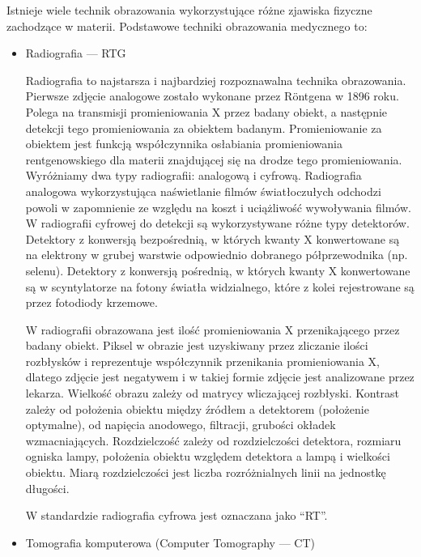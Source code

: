 Istnieje wiele technik obrazowania wykorzystujące różne zjawiska fizyczne zachodzące w materii.
Podstawowe techniki obrazowania medycznego to:
\label{sec:basic-imaging-technics}
\begin{itemize}
    \item Radiografia --- RTG

          Radiografia to najstarsza i najbardziej rozpoznawalna technika obrazowania.
          Pierwsze zdjęcie analogowe zostało wykonane przez Röntgena w 1896 roku.
          Polega na transmisji promieniowania X przez badany obiekt, a następnie detekcji tego promieniowania za obiektem badanym.
          Promieniowanie za obiektem jest funkcją współczynnika osłabiania promieniowania rentgenowskiego dla materii znajdującej się na drodze tego promieniowania.
          Wyróżniamy dwa typy radiografii: analogową i cyfrową.
          Radiografia analogowa wykorzystująca naświetlanie filmów światłoczułych odchodzi powoli w zapomnienie ze względu na koszt i uciążliwość wywoływania filmów.
          W radiografii cyfrowej do detekcji są wykorzystywane różne typy detektorów.
          Detektory z konwersją bezpośrednią, w których kwanty X konwertowane są na elektrony w grubej warstwie odpowiednio dobranego półprzewodnika (np. selenu).
          Detektory z konwersją pośrednią, w których kwanty X konwertowane są w scyntylatorze na fotony światła widzialnego, które z kolei rejestrowane są przez fotodiody krzemowe.

          W radiografii obrazowana jest ilość promieniowania X przenikającego przez badany obiekt.
          Piksel w obrazie jest uzyskiwany przez zliczanie ilości rozbłysków i reprezentuje współczynnik przenikania promieniowania X, dlatego zdjęcie jest negatywem i w takiej formie zdjęcie jest analizowane przez lekarza.
          Wielkość obrazu zależy od matrycy wliczającej rozbłyski.
          Kontrast zależy od położenia obiektu między źródłem a detektorem (położenie optymalne), od napięcia anodowego, filtracji, grubości okładek wzmacniających.
          Rozdzielczość zależy od rozdzielczości detektora, rozmiaru ogniska lampy, położenia obiektu względem detektora a lampą i wielkości obiektu.
          Miarą rozdzielczości jest liczba rozróżnialnych linii na jednostkę długości.

          W standardzie \DICOM radiografia cyfrowa jest oznaczana jako \enquote{RT}.

    \item Tomografia komputerowa (Computer Tomography --- CT)


\end{itemize}
